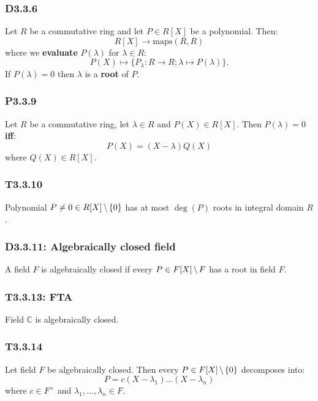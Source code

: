 \documentclass{article}
\begin{document}
\begin{multicols*}{3}
\subsubsection*{D3.3.6}
Let $R$ be a commutative ring and let $P\in R[X]$
be a polynomial. Then:
$$R[X]\rightarrow\text{maps}(R,R)$$
where we \textbf{evaluate} $P(\lambda)$ for $\lambda\in R$:
$$P(X)\mapsto\{P_{\lambda}:R\rightarrow R;
\lambda\mapsto P(\lambda)\}.$$
If $P(\lambda)=0$ then $\lambda$ is a 
\textbf{root} of $P$.

\subsubsection*{P3.3.9}
Let $R$ be a commutative ring, let $\lambda\in R$
and $P(X)\in R[X]$. Then $P(\lambda)=0$ \textbf{if{}f}:
$$P(X)=(X-\lambda)Q(X)$$
where $Q(X)\in R[X]$.

\subsubsection*{T3.3.10}
Polynomial
$P\neq0\in R[X]\hspace{0.02in}\backslash\hspace{0.02in}\{0\}$
has at most $\deg(P)$ roots in integral domain $R$.

\subsubsection*{D3.3.11: Algebraically closed field}
A field $F$ is algebraically closed if every
$P\in F[X]\hspace{0.02in}\backslash\hspace{0.02in}F$
has a root in field $F$.

\subsubsection*{T3.3.13: FTA}
Field $\mathbb{C}$ is algebraically closed.

\subsubsection*{T3.3.14}
Let field $F$ be algebraically closed. Then every
$P\in F[X]\hspace{0.02in}\backslash\hspace{0.02in}\{0\}$
decomposes into:
$$P=c(X-\lambda_1)\dots(X-\lambda_n)$$
where $c\in F^{\times}$ and $\lambda_1,\dots,\lambda_n\in F$.


\end{multicols*}
\end{document}
